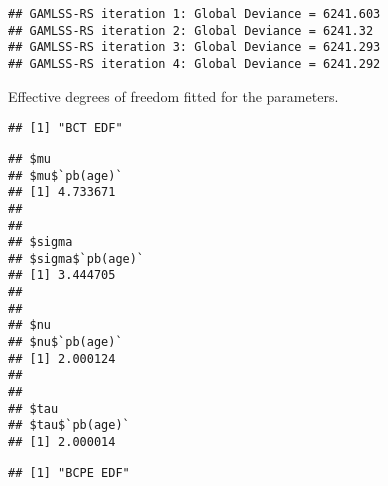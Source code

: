 \begin{verbatim}
## GAMLSS-RS iteration 1: Global Deviance = 6241.603 
## GAMLSS-RS iteration 2: Global Deviance = 6241.32 
## GAMLSS-RS iteration 3: Global Deviance = 6241.293 
## GAMLSS-RS iteration 4: Global Deviance = 6241.292
\end{verbatim}

Effective degrees of freedom fitted for the parameters.

\begin{Shaded}
\begin{Highlighting}[]

\OtherTok{\textless{}{-}} 

\OtherTok{\textless{}{-}} 

\NormalTok{(}\NormalTok{)}
\end{Highlighting}
\end{Shaded}

\begin{verbatim}
## [1] "BCT EDF"
\end{verbatim}

\begin{Shaded}
\begin{Highlighting}[]
\end{Highlighting}
\end{Shaded}

\begin{verbatim}
## $mu
## $mu$`pb(age)`
## [1] 4.733671
## 
## 
## $sigma
## $sigma$`pb(age)`
## [1] 3.444705
## 
## 
## $nu
## $nu$`pb(age)`
## [1] 2.000124
## 
## 
## $tau
## $tau$`pb(age)`
## [1] 2.000014
\end{verbatim}

\begin{Shaded}
\begin{Highlighting}[]
\NormalTok{(}\NormalTok{)}
\end{Highlighting}
\end{Shaded}

\begin{verbatim}
## [1] "BCPE EDF"
\end{verbatim}

